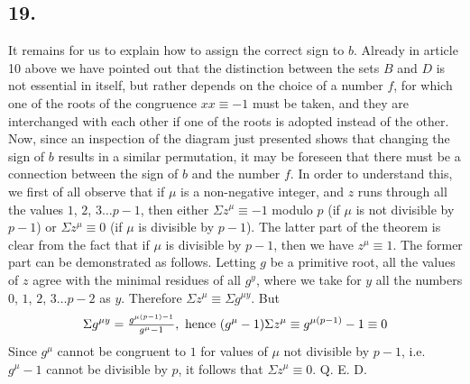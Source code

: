 \documentclass[twoside,12pt]{memoir}
\let\oldfrac\frac
\def\frac#1#2{\mathchoice{\tfrac{#1}{#2}}{\oldfrac{#1}{#2}}{\genfrac{}{}{}{2}{#1}{#2\mathstrut}}{\genfrac{}{}{}{3}{#1}{#2\mathstrut}}}
\begin{document}
\subsection*{19.}

It remains for us to explain how to assign the correct sign to \(b\). Already in article 10 above we have pointed out that the distinction between the sets \(B\) and \(D\) is not essential in itself, but rather depends on the choice of a number \(f\), for which one of the roots of the congruence \(x x \equiv-1\) must be taken, and they are interchanged with each other if one of the roots is adopted instead of the other. Now, since an inspection of the diagram just presented shows that changing the sign of \(b\) results in a similar permutation, it may be foreseen that there must be a connection between the sign of \(b\) and the number \(f\). In order to understand this, we first of all observe that if \(\mu\) is a non-negative integer, and \(z\) runs through all the values \(1\), \(2\), \(3 \ldots p-1\), then either \(\Sigma z^{\mu} \equiv -1\) modulo \(p\) (if \(\mu\) is not divisible by \(p-1\)) or \(\Sigma z^{\mu} \equiv 0\) (if \(\mu\) is divisible by \(p-1\)). The latter part of the theorem is clear from the fact that if \(\mu\) is divisible by \(p-1\), then we have \(z^{\mu} \equiv 1\). The former part can be demonstrated as follows. Letting \(g\) be a primitive root, all the values of \(z\) agree with the minimal residues of all \(g^{y}\), where we take for \(y\) all the numbers \(0\), \(1\), \(2\), \(3 \ldots p-2\) as \(y\). Therefore \(\Sigma z^{\mu} \equiv \Sigma g^{\mu y}\). But 
\[\Sigma g^{\mu y}=\frac{g^{\mu(p-1)-1}}{g^{\mu}-1}, \text{ hence } (g^{\mu}-1) \Sigma z^{\mu} \equiv g^{\mu(p-1)}-1 \equiv 0\]
Since \(g^{\mu}\) cannot be congruent to \(1\) for values of \(\mu\) not divisible by \(p-1\), i{.}e{.} \(g^{\mu}-1\) cannot be divisible by \(p\), it follows that \(\Sigma z^{\mu} \equiv 0\). Q. E. D.\pagebreak%
\end{document}
